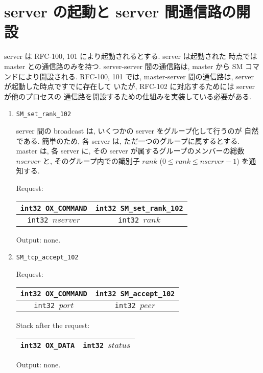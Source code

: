 \documentclass[12pt]{jarticle}
\begin{document}
\section{server の起動と server 間通信路の開設}

server は RFC-100, 101 により起動されるとする. server は起動された
時点では master との通信路のみを持つ. server-server 間の通信路は,
master から SM コマンドにより開設される. RFC-100, 101 では,
master-server 間の通信路は, server が起動した時点ですでに存在して
いたが, RFC-102 に対応するためには server が他のプロセスの
通信路を開設するための仕組みを実装している必要がある.

\begin{enumerate}
\item
\begin{verbatim}
SM_set_rank_102
\end{verbatim}

server 間の broadcast は, いくつかの server をグループ化して行うのが
自然である. 簡単のため, 各 server は, ただ一つのグループに属するとする.
master は, 各 server に, その server が属するグループのメンバーの総数
$nserver$ と, そのグループ内での識別子 $rank$ ($0\le rank \le nserver-1$)
を通知する.

Request:
\begin{tabular}{|c|c|}  \hline
{\tt int32 OX\_COMMAND} & {\tt int32 SM\_set\_rank\_102} \\ \hline
{\tt int32 $nserver$} & {\tt int32 $rank$} \\
\hline
\end{tabular}

Output: none.

\item
\begin{verbatim}
SM_tcp_accept_102
\end{verbatim}

Request:
\begin{tabular}{|c|c|}  \hline
{\tt int32 OX\_COMMAND} & {\tt int32 SM\_accept\_102} \\ \hline
{\tt int32 $port$} & {\tt int32 $peer$} \\
\hline
\end{tabular}

Stack after the request:
\begin{tabular}{|c|c|}  \hline
{\tt int32 OX\_DATA} & {\tt int32 $status$} \\
\hline
\end{tabular}

Output: none.


\end{enumerate}
\end{document}
